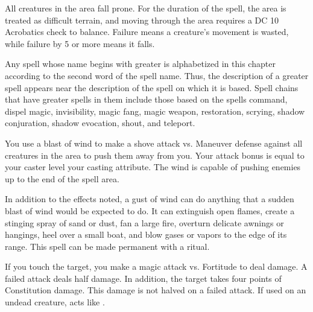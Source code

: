 \spelldur{\durshort \dismissable}
\spelleffect All creatures in the area fall prone. For the duration of the spell, the area is treated as difficult terrain, and moving through the area requires a DC 10 Acrobatics check to balance. Failure means a creature's movement is wasted, while failure by 5 or more means it falls.

\par Any spell whose name begins with greater is alphabetized in this chapter according to the second word of the spell name. Thus, the description of a greater spell appears near the description of the spell on which it is based. Spell chains that have greater spells in them include those based on the spells command, dispel magic, invisibility, magic fang, magic weapon, restoration, scrying, shadow conjuration, shadow evocation, shout, and teleport.

\spelleffect You use a blast of wind to make a shove attack vs. Maneuver defense against all creatures in the area to push them away from you. Your attack bonus is equal to your caster level \add your casting attribute. The wind is capable of pushing enemies up to the end of the spell area. 
\par In addition to the effects noted, a gust of wind can do anything that a sudden blast of wind would be expected to do. It can extinguish open flames, create a stinging spray of sand or dust, fan a large fire, overturn delicate awnings or hangings, heel over a small boat, and blow gases or vapors to the edge of its range.
\spellnotes This spell can be made permanent with a  ritual.

\begin{comment}
\subsubsection{H}
\end{comment}

\spelleffect If you touch the target, you make a magic attack vs. Fortitude to deal damage. A failed attack deals half damage. In addition, the target takes four points of Constitution damage. This damage is not halved on a failed attack.
\spellnotes If used on an undead creature,  acts like .

